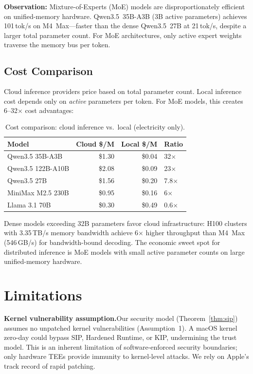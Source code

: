 \documentclass[10pt,twocolumn,letterpaper]{article}
\begin{document}
\textbf{Observation:} Mixture-of-Experts (MoE) models are disproportionately efficient on unified-memory hardware. Qwen3.5~35B-A3B (3B active parameters) achieves 101\,tok/s on M4~Max---faster than the dense Qwen3.5~27B at 21\,tok/s, despite a larger total parameter count. For MoE architectures, only active expert weights traverse the memory bus per token.

\subsection{Cost Comparison}

Cloud inference providers price based on total parameter count. Local inference cost depends only on \emph{active} parameters per token. For MoE models, this creates 6--32$\times$ cost advantages:

\begin{table}[h]
\centering
\caption{Cost comparison: cloud inference vs.\ local (electricity only).}
\vspace{4pt}
\small
\begin{tabular}{@{}lrrl@{}}
\toprule
\textbf{Model} & \textbf{Cloud \$/M} & \textbf{Local \$/M} & \textbf{Ratio} \\
\midrule
Qwen3.5 35B-A3B & \$1.30 & \$0.04 & 32$\times$ \\
Qwen3.5 122B-A10B & \$2.08 & \$0.09 & 23$\times$ \\
Qwen3.5 27B & \$1.56 & \$0.20 & 7.8$\times$ \\
MiniMax M2.5 230B & \$0.95 & \$0.16 & 6$\times$ \\
Llama 3.1 70B & \$0.30 & \$0.49 & 0.6$\times$ \\
\bottomrule
\end{tabular}
\end{table}

Dense models exceeding 32B parameters favor cloud infrastructure: H100 clusters with 3.35\,TB/s memory bandwidth achieve 6$\times$ higher throughput than M4~Max (546\,GB/s) for bandwidth-bound decoding. The economic sweet spot for distributed inference is MoE models with small active parameter counts on large unified-memory hardware.

\section{Limitations}
\label{sec:limitations}

\textbf{Kernel vulnerability assumption.}\quad Our security model (Theorem~\ref{thm:sip}) assumes no unpatched kernel vulnerabilities (Assumption~1). A macOS kernel zero-day could bypass SIP, Hardened Runtime, or KIP, undermining the trust model. This is an inherent limitation of software-enforced security boundaries; only hardware TEEs provide immunity to kernel-level attacks. We rely on Apple's track record of rapid patching.
\end{document}
